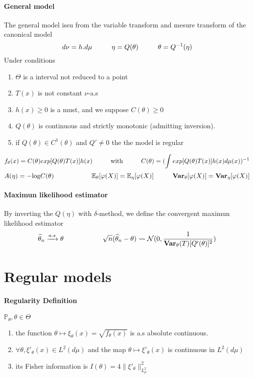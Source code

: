 \documentclass[a4paper,10pt]{article}
\begin{document}
\paragraph{General model}
The general model issu from the variable transform and mesure transform of the canonical model
\[
d\nu = h.d\mu  \hspace{10mm} \eta = Q(\theta) \hspace{10mm}  \theta = Q^{-1}(\eta) 
\]
Under conditions 
\begin{enumerate}
 \item $\Theta$ is a interval not reduced to a point
 \item $T(x)$ is not constant $\nu$-a.s
 \item $h(x) \geq 0$ is a must, and we suppose $C(\theta) \geq 0$
 \item $Q(\theta)$ is continuous and strictly monotonic (admitting inversion). 
 \item if $Q(\theta) \in C^{1}(\theta)$ and $Q'\neq 0$ the the model is regular
\end{enumerate}

\[
f_{\theta}(x) = C(\theta) exp[Q(\theta) T(x)] h(x)
\hspace{10mm} \text{with} \hspace{10mm}
C(\theta) = (\int exp[Q(\theta) T(x)] h(x) d\mu(x) ) ^{-1}
\]
\[
A(\eta) = -\text{log}C(\theta)
\hspace{20mm} 
\mathbb{E}_{\theta}[\varphi(X)]  = \mathbb{E}_{\eta}[\varphi(X)]
 \hspace{10mm}
\textbf{Var}_{\theta}[\varphi(X)]  = \textbf{Var}_{\eta}[\varphi(X)]
\]
\paragraph{Maximun likelihood estimator}
By inverting the $Q(\eta)$ with $\delta$-method, we define the convergent maximun likelihood estimator 
\[
\widehat{\theta}_n \xrightarrow{a.s} \theta 
\hspace{20mm}
\sqrt{n}(\widehat{\theta}_n - \theta ) \rightsquigarrow   \mathcal{N}(0,\frac{1}{\textbf{Var}_{\theta}(T)[Q'(\theta)]^2  } )
\]
\section{Regular models}
\paragraph{Regularity Definition}  {$\mathbb{P}_{\theta},\theta \in \Theta$}
\begin{enumerate}
 \item the function $\theta \mapsto \xi_{\theta}(x)=\sqrt{f_{\theta}(x)}$ is a.s absolute continuous.
 \item $\forall \theta, \xi'_{\theta}(x) \in L^2(d\mu)$ and the map $\theta \mapsto \xi'_{\theta}(x)$ is continuous in $L^2(d\mu)$
 \item its Fisher information is $I(\theta) = 4 \| \xi'_{\theta} \|^{2}_{L^2_{\mu}}$
\end{enumerate}
\end{document}

